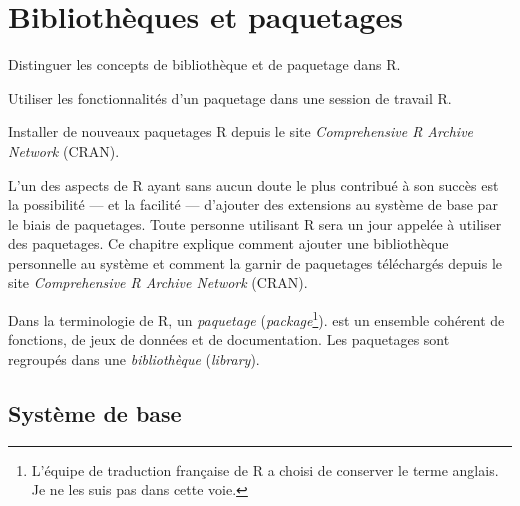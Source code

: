 
\chapter{Bibliothèques et paquetages}
\label{chap:paquetages}

\def\scriptfilename{\currfilebase.R}

\begin{objectifs}
\item Distinguer les concepts de bibliothèque et de paquetage dans R.
\item Utiliser les fonctionnalités d'un paquetage dans une session de
  travail R.
\item Installer de nouveaux paquetages R depuis le site
  \emph{Comprehensive R Archive Network} (CRAN).
\end{objectifs}

L'un des aspects de R ayant sans aucun doute le plus contribué à son
succès est la possibilité --- et la facilité --- d'ajouter des
extensions au système de base par le biais de paquetages. Toute
personne utilisant R sera un jour appelée à utiliser des paquetages.
Ce chapitre explique comment ajouter une bibliothèque personnelle au
système et comment la garnir de paquetages téléchargés depuis le site
\emph{Comprehensive R Archive Network} (CRAN).

Dans la terminologie de R, un \emph{paquetage}
(\emph{package}\footnote{%
  L'équipe de traduction française de R a choisi de conserver le terme
  anglais. Je ne les suis pas dans cette voie.}). %
est un ensemble cohérent de fonctions, de jeux de données et de
documentation. Les paquetages sont regroupés dans une
\emph{bibliothèque} (\emph{library}).



\section{Système de base}
\label{sec:paquetages:base}


